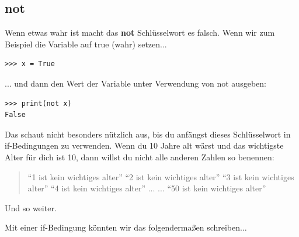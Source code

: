 \subsection*{not}

Wenn etwas wahr ist macht das \textbf{not} Schlüsselwort es falsch. Wenn wir zum Beispiel die Variable  auf true (wahr) setzen...

\begin{Verbatim}[frame=single]
>>> x = True
\end{Verbatim}

... und dann den Wert der Variable unter Verwendung von not ausgeben:

\begin{Verbatim}[frame=single]
>>> print(not x)
False
\end{Verbatim}

Das schaut nicht besonders nützlich aus, bis du anfängst dieses Schlüsselwort in if-Bedingungen zu verwenden. Wenn du 10 Jahre alt wärst und das wichtigste Alter für dich ist 10, dann willst du nicht alle anderen Zahlen so benennen:

\begin{quotation}
``1 ist kein wichtiges alter''
``2 ist kein wichtiges alter''
``3 ist kein wichtiges alter''
``4 ist kein wichtiges alter''
...
...
``50 ist kein wichtiges alter''
\end{quotation}

Und so weiter.
\par\noindent
Mit einer if-Bedingung könnten wir das folgendermaßen schreiben$\ldots$

